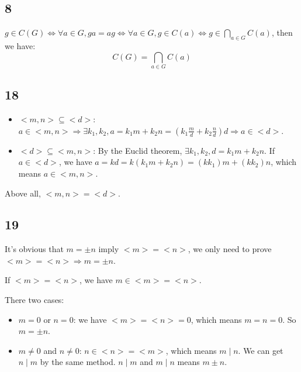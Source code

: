 \documentclass{article}
\begin{document}
		\subsection*{8}
			$g \in C(G) \Leftrightarrow \forall a \in G, ga=ag \Leftrightarrow \forall
			a \in G, g \in C(a) \Leftrightarrow g \in \bigcap_{a \in G}C(a)$, then we
			have:
			$$
				C(G) = \bigcap_{a \in G}C(a)
			$$

		\subsection*{18}

		\begin{itemize}
			\item $<m,n> \subseteq <d>$: $a \in <m,n> \Rightarrow \exists k_1, k_2, a
				= k_1m+k_2n = (k_1\frac{m}{d} + k_2\frac{n}{d})d \Rightarrow a \in <d>$.
		  \item $<d> \subseteq <m,n>$: By the Euclid theorem, $\exists k_1, k_2, d =
				k_1m+k_2n$. If $a \in <d>$, we have $a = kd = k(k_1m + k_2n) = (kk_1)m +
				(kk_2)n$, which means $a \in <m,n>$.
		\end{itemize}
		
		Above all, $<m,n> = <d>$.

		\subsection*{19}

		It's obvious that $m = \pm n$ imply $<m> = <n>$, we only need to prove $<m>
		= <n> \Rightarrow m = \pm n$.

		If $<m> = <n>$, we have $m \in <m> = <n>$.
		
		There two cases:
		\begin{itemize}
			\item $m = 0$ or $n = 0$: we have $<m> = <n> = {0}$, which means $m = n = 0$. So $m = \pm
				n$.
			\item $m \neq 0$ and $n \neq 0$: $n \in <n> = <m>$, which means $m \mid
				n$. We can get $n \mid m$ by the same method. $n \mid m$ and $m \mid n$
				means $m \pm n$.
		\end{itemize}
\end{document}

